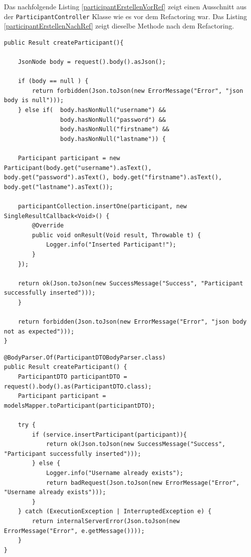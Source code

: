 Das nachfolgende Listing \ref{participantErstellenVorRef} zeigt einen Ausschnitt aus der \texttt{Participant\-Controller} Klasse wie es vor dem Refactoring war. Das Listing \ref{participantErstellenNachRef} zeigt dieselbe Methode nach dem Refactoring.

\begin{lstlisting}[caption={Participant erstellen vor Refactoring}, label=participantErstellenVorRef]
public Result createParticipant(){

    JsonNode body = request().body().asJson();

    if (body == null ) {
        return forbidden(Json.toJson(new ErrorMessage("Error", "json body is null")));
    } else if(  body.hasNonNull("username") &&
            	body.hasNonNull("password") &&
            	body.hasNonNull("firstname") &&
            	body.hasNonNull("lastname")) {

    Participant participant = new Participant(body.get("username").asText(), body.get("password").asText(), body.get("firstname").asText(), body.get("lastname").asText());

    participantCollection.insertOne(participant, new SingleResultCallback<Void>() {
        @Override
        public void onResult(Void result, Throwable t) {
            Logger.info("Inserted Participant!");
        }
    });

    return ok(Json.toJson(new SuccessMessage("Success", "Participant successfully inserted")));
    }

    return forbidden(Json.toJson(new ErrorMessage("Error", "json body not as expected")));
}
\end{lstlisting}

\begin{lstlisting}[caption={Participant erstellen nach Refactoring}, label=participantErstellenNachRef]
@BodyParser.Of(ParticipantDTOBodyParser.class)
public Result createParticipant() {
    ParticipantDTO participantDTO = request().body().as(ParticipantDTO.class);
    Participant participant = modelsMapper.toParticipant(participantDTO);

    try {
        if (service.insertParticipant(participant)){
            return ok(Json.toJson(new SuccessMessage("Success", "Participant successfully inserted")));
        } else {
            Logger.info("Username already exists");
            return badRequest(Json.toJson(new ErrorMessage("Error", "Username already exists")));
        }
    } catch (ExecutionException | InterruptedException e) {
        return internalServerError(Json.toJson(new ErrorMessage("Error", e.getMessage())));
    }
}
\end{lstlisting}

